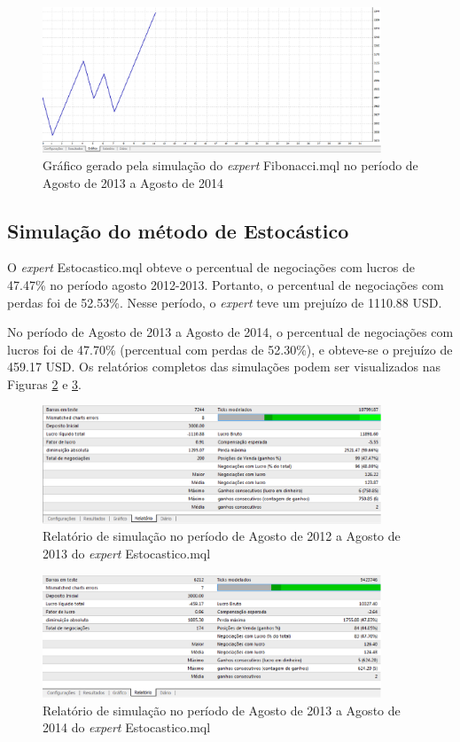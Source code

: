 \begin{figure}[H]
\centering
\includegraphics[width=0.9\textwidth]{figuras/protocoloFib4}
\caption{Gráfico gerado pela simulação do \textit{expert} Fibonacci.mql no período de Agosto de 2013 a Agosto de 2014}
\label{protocoloFib4}
\end{figure}

\subsection{Simulação do método de Estocástico}

O \textit{expert} Estocastico.mql obteve o percentual de negociações com lucros de 47.47\% no período agosto 2012-2013. Portanto, o percentual de negociações com perdas foi de 52.53\%. Nesse período, o \textit{expert} teve um prejuízo de 1110.88 USD.

No período de Agosto de 2013 a Agosto de 2014, o percentual de negociações com lucros foi de 47.70\% (percentual com perdas de 52.30\%),  e obteve-se o prejuízo de 459.17 USD. 
Os relatórios completos das simulações podem ser visualizados nas Figuras \ref{protocoloEst} e \ref{protocoloEst2}.

\begin{figure}[H]
\centering
\includegraphics[width=0.9\textwidth]{figuras/protocoloEst}
\caption{Relatório de simulação no período de Agosto de 2012 a Agosto de 2013 do \textit{expert} Estocastico.mql}
\label{protocoloEst}
\end{figure}

\begin{figure}[H]
\centering
\includegraphics[width=0.9\textwidth]{figuras/protocoloEst2}
\caption{Relatório de simulação no período de Agosto de 2013 a Agosto de 2014 do \textit{expert} Estocastico.mql}
\label{protocoloEst2}
\end{figure}

